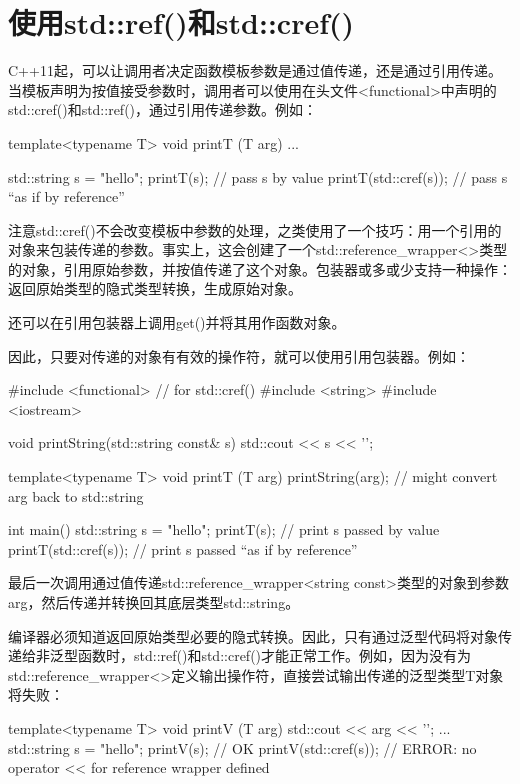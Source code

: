 \section{使用std::ref()和std::cref()}
C++11起，可以让调用者决定函数模板参数是通过值传递，还是通过引用传递。当模板声明为按值接受参数时，调用者可以使用在头文件<functional>中声明的std::cref()和std::ref()，通过引用传递参数。例如：

\begin{cpp}
template<typename T>
void printT (T arg) {
	...
}

std::string s = "hello";
printT(s); // pass s by value
printT(std::cref(s)); // pass s “as if by reference”
\end{cpp}

注意std::cref()不会改变模板中参数的处理，之类使用了一个技巧：用一个引用的对象来包装传递的参数。事实上，这会创建了一个std::reference\_wrapper<>类型的对象，引用原始参数，并按值传递了这个对象。包装器或多或少支持一种操作：返回原始类型的隐式类型转换，生成原始对象。

\begin{notice}
还可以在引用包装器上调用get()并将其用作函数对象。
\end{notice}

因此，只要对传递的对象有有效的操作符，就可以使用引用包装器。例如：

\begin{cpp}
#include <functional> // for std::cref()
#include <string>
#include <iostream>

void printString(std::string const& s) {
	std::cout << s << '\n';
}

template<typename T>
void printT (T arg) {
	printString(arg); // might convert arg back to std::string
}

int main() {
	std::string s = "hello";
	printT(s); // print s passed by value
	printT(std::cref(s)); // print s passed “as if by reference”
}
\end{cpp}

最后一次调用通过值传递std::reference\_wrapper<string const>类型的对象到参数arg，然后传递并转换回其底层类型std::string。

编译器必须知道返回原始类型必要的隐式转换。因此，只有通过泛型代码将对象传递给非泛型函数时，std::ref()和std::cref()才能正常工作。例如，因为没有为std::reference\_wrapper<>定义输出操作符，直接尝试输出传递的泛型类型T对象将失败：

\begin{cpp}
template<typename T>
void printV (T arg) {
	std::cout << arg << '\n';
}
...
std::string s = "hello";
printV(s); // OK
printV(std::cref(s)); // ERROR: no operator << for reference wrapper defined
\end{cpp}

